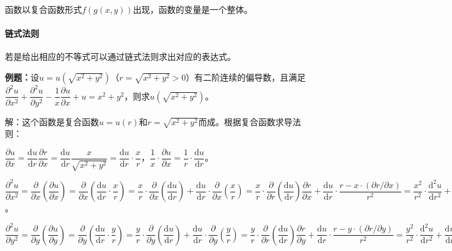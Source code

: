 \documentclass[UTF8, 12pt]{ctexart}
\begin{document}
函数以复合函数形式$f(g(x,y))$出现，函数的变量是一个整体。

\paragraph{链式法则} \leavevmode \medskip

若是给出相应的不等式可以通过链式法则求出对应的表达式。

\textbf{例题：}设$u=u(\sqrt{x^2+y^2})$（$r=\sqrt{x^2+y^2}>0$）有二阶连续的偏导数，且满足$\dfrac{\partial^2u}{\partial x^2}+\dfrac{\partial^2u}{\partial y^2}-\dfrac{1}{x}\dfrac{\partial u}{\partial x}+u=x^2+y^2$，则求$u(\sqrt{x^2+y^2})$。

解：这个函数是复合函数$u=u(r)$和$r=\sqrt{x^2+y^2}$而成。根据复合函数求导法则：

$\dfrac{\partial u}{\partial x}=\dfrac{\textrm{d}u}{\textrm{d}r}\dfrac{\partial r}{\partial x}=\dfrac{\textrm{d}u}{\textrm{d}r}\dfrac{x}{\sqrt{x^2+y^2}}=\dfrac{\textrm{d}u}{\textrm{d}r}\cdot\dfrac{x}{r}$，$\dfrac{1}{x}\cdot\dfrac{\partial u}{\partial x}=\dfrac{1}{r}\cdot\dfrac{\textrm{d}u}{\textrm{d}r}$。

$\dfrac{\partial^2u}{\partial x^2}=\dfrac{\partial}{\partial x}\left(\dfrac{\partial u}{\partial x}\right)=\dfrac{\partial}{\partial x}\left(\dfrac{\textrm{d}u}{\textrm{d}r}\cdot\dfrac{x}{r}\right)=\dfrac{x}{r}\cdot\dfrac{\partial}{\partial x}\left(\dfrac{\textrm{d}u}{\textrm{d}r}\right)+\dfrac{\textrm{d}u}{\textrm{d}r}\cdot\dfrac{\partial}{\partial x}\left(\dfrac{x}{r}\right)=\dfrac{x}{r}\cdot\dfrac{\partial}{\partial r}\left(\dfrac{\textrm{d}u}{\textrm{d}r}\right)\dfrac{\partial r}{\partial x}+\dfrac{\textrm{d}u}{\textrm{d}r}\cdot\dfrac{r-x\cdot(\partial r/\partial x)}{r^2}=\dfrac{x^2}{r^2}\cdot\dfrac{\textrm{d}^2u}{\textrm{d}r^2}+\dfrac{\textrm{d}u}{\textrm{d}r}\cdot\dfrac{r^2-x^2}{r^3}$。

$\dfrac{\partial^2u}{\partial y^2}=\dfrac{\partial}{\partial y}\left(\dfrac{\partial u}{\partial y}\right)=\dfrac{\partial}{\partial y}\left(\dfrac{\textrm{d}u}{\textrm{d}r}\cdot\dfrac{y}{r}\right)=\dfrac{y}{r}\cdot\dfrac{\partial}{\partial y}\left(\dfrac{\textrm{d}u}{\textrm{d}r}\right)+\dfrac{\textrm{d}u}{\textrm{d}r}\cdot\dfrac{\partial}{\partial y}\left(\dfrac{y}{r}\right)=\dfrac{y}{r}\cdot\dfrac{\partial}{\partial r}\left(\dfrac{\textrm{d}u}{\textrm{d}r}\right)\dfrac{\partial r}{\partial y}+\dfrac{\textrm{d}u}{\textrm{d}r}\cdot\dfrac{r-y\cdot(\partial r/\partial y)}{r^2}=\dfrac{y^2}{r^2}\cdot\dfrac{\textrm{d}^2u}{\textrm{d}r^2}+\dfrac{\textrm{d}u}{\textrm{d}r}\cdot\dfrac{r^2-x^2}{r^3}$
\end{document}
